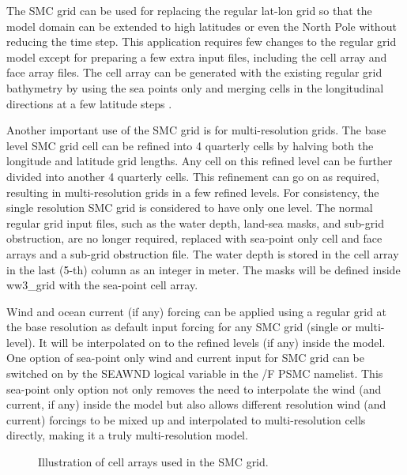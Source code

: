 The SMC grid can be used for replacing the regular lat-lon grid so that the
model domain can be extended to high latitudes or even the North Pole without
reducing the time step. This application requires few changes to the
regular grid model except for preparing a few extra input files, including the
cell array and face array files. The cell array can be generated with the
existing regular grid bathymetry by using the sea points only and merging
cells in the longitudinal directions at a few latitude steps \citep{art:Li11}.

Another important use of the SMC grid is for multi-resolution grids.
The base level SMC grid cell can be refined into 4 quarterly cells
by halving both the longitude and latitude grid lengths. Any cell
on this refined level can be further divided into another 4 quarterly
cells. This refinement can go on as required, resulting in multi-resolution
grids in a few refined levels. For consistency, the single resolution
SMC grid is considered to have only one level.  The normal regular grid input 
files, such as the water depth, land-sea masks, and sub-grid obstruction,
are no longer required, replaced with sea-point only cell and face arrays
and a sub-grid obstruction file.  The water depth is stored in the cell array 
in the last (5-th) column as an integer in meter.  The masks will be defined  
inside ww3\_grid with the sea-point cell array.

Wind and ocean current (if any) forcing can be applied using a regular grid at the base 
resolution as default input forcing for any SMC grid (single or multi-level). 
It will be interpolated on to the refined levels (if any) inside the model.
One option of sea-point only wind and current input for SMC grid can be 
switched on by the {\code SEAWND} logical variable in the {/F PSMC} namelist.  
This sea-point only option not only removes the need to interpolate the wind 
(and current, if any) inside the model but also allows different resolution wind 
(and current) forcings to be mixed up and interpolated to multi-resolution cells 
directly, making it a truly multi-resolution model. 

\begin{figure}
\centerline{}
\caption{Illustration of cell arrays used in the SMC grid.}
\label{fig:SMCells} \botline
\end{figure}

